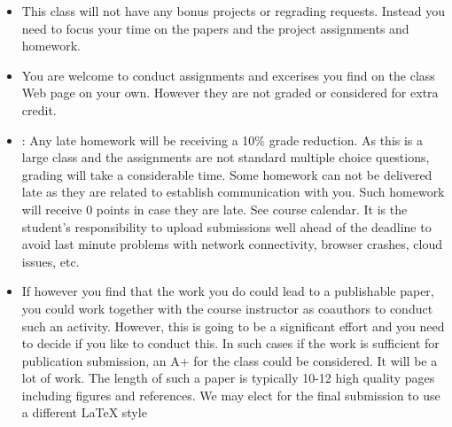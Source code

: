 \begin{itemize}
\item {} 
 This class will not have any bonus projects
or regrading requests. Instead you need to focus your time on the
papers and the project assignments and homework.

\item {} 
 You are welcome to conduct assignments and
excerises you find on the class Web page on your own. However they
are not graded or considered for extra credit.

\item {} 
: Any late homework will be receiving a 10\% grade
reduction.  As this is a large class and the assignments are not
standard multiple choice questions, grading will take a considerable
time. Some homework can not be delivered late as they are related to
establish communication with you. Such 
homework will receive 0 points in case they are late. See course
calendar. It is the student’s responsibility to upload submissions
well ahead of the deadline to avoid last minute problems with
network connectivity, browser crashes, cloud issues, etc.

\item {} 
 If however you find that the work
you do could lead to a publishable paper, you could work together
with the course instructor as coauthors to conduct such an
activity. However, this is going to be a significant effort and you
need to decide if you like to conduct this. In such cases if the
work is sufficient for publication submission, an A+ for the class
could be considered. It will be a lot of work. The length of such a
paper is typically 10-12 high quality pages including figures and
references. We may elect for the final submission to use a different
LaTeX style

\end{itemize}


